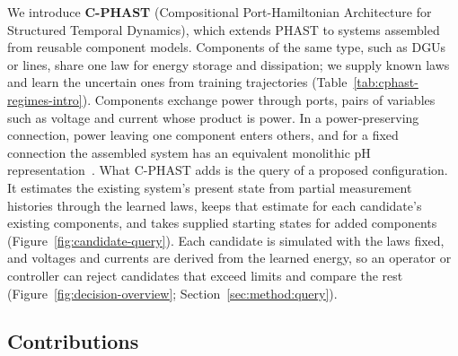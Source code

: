 We introduce \textbf{C-PHAST} (Compositional Port-Hamiltonian Architecture for Structured Temporal Dynamics), which extends PHAST to systems assembled from reusable component models.
Components of the same type, such as DGUs or lines, share one law for energy storage and dissipation; we supply known laws and learn the uncertain ones from training trajectories (Table~\ref{tab:cphast-regimes-intro}).
Components exchange power through ports, pairs of variables such as voltage and current whose product is power.
In a power-preserving connection, power leaving one component enters others, and for a fixed connection the assembled system has an equivalent monolithic pH representation~\citep{ehrhardt2025coupling}.
What C-PHAST adds is the query of a proposed configuration.
It estimates the existing system's present state from partial measurement histories through the learned laws, keeps that estimate for each candidate's existing components, and takes supplied starting states for added components (Figure~\ref{fig:candidate-query}).
Each candidate is simulated with the laws fixed, and voltages and currents are derived from the learned energy, so an operator or controller can reject candidates that exceed limits and compare the rest (Figure~\ref{fig:decision-overview}; Section~\ref{sec:method:query}).



\subsection{Contributions}

